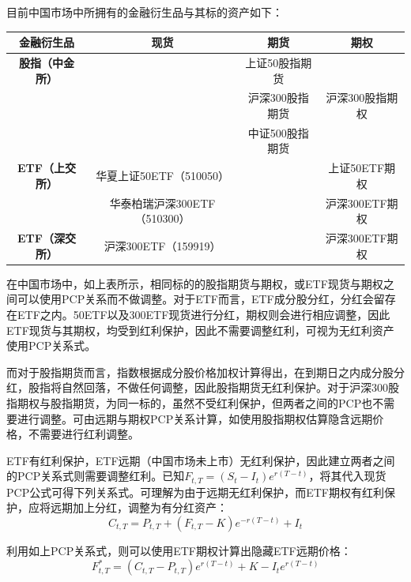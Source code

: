 \documentclass[11pt]{article}
\begin{document}
目前中国市场中所拥有的金融衍生品与其标的资产如下：
\begin{table}[H]
\centering
\begin{tabular}{@{}cccc@{}}
\toprule
\textbf{金融衍生品}    & \textbf{现货}          & \textbf{期货} & \textbf{期权} \\ \midrule
\textbf{股指（中金所）}  &                      & 上证50股指期货    &             \\
\textbf{}         &                      & 沪深300股指期货   & 沪深300股指期权   \\
\textbf{}         &                      & 中证500股指期货   &             \\
\textbf{ETF（上交所）} & 华夏上证50ETF（510050）    &             & 上证50ETF期权   \\
\textbf{}         & 华泰柏瑞沪深300ETF（510300） &             & 沪深300ETF期权  \\
\textbf{ETF（深交所）} & 沪深300ETF（159919）     &             & 沪深300ETF期权  \\ \bottomrule
\end{tabular}
\end{table}

在中国市场中，如上表所示，相同标的的股指期货与期权，或ETF现货与期权之间可以使用PCP关系而不做调整。对于ETF而言，ETF成分股分红，分红会留存在ETF之内。50ETF以及300ETF现货进行分红，期权则会进行相应调整，因此ETF现货与其期权，均受到红利保护，因此不需要调整红利，可视为无红利资产使用PCP关系式。

而对于股指期货而言，指数根据成分股价格加权计算得出，在到期日之内成分股分红，股指将自然回落，不做任何调整，因此股指期货无红利保护。对于沪深300股指期权与股指期货，为同一标的，虽然不受红利保护，但两者之间的PCP也不需要进行调整。可由远期与期权PCP关系计算，如使用股指期权估算隐含远期价格，不需要进行红利调整。

ETF有红利保护，ETF远期（中国市场未上市）无红利保护，因此建立两者之间的PCP关系式则需要调整红利。已知$F_{t,T} = (S_t - I_t)e^{r(T-t)}$，将其代入现货PCP公式可得下列关系式。可理解为由于远期无红利保护，而ETF期权有红利保护，应将远期加上分红，调整为有分红资产：
\begin{equation*}
    C_{t,T} = P_{t,T} + \left( F_{t,T}-K \right) e^{-r(T-t)} + I_t
\end{equation*}

利用如上PCP关系式，则可以使用ETF期权计算出隐藏ETF远期价格：
\begin{equation*}
    F^*_{t,T} = \left( C_{t,T} - P_{t,T} \right) e^{r(T-t)} + K - I_t e^{r(T-t)}
\end{equation*}
\end{document}

